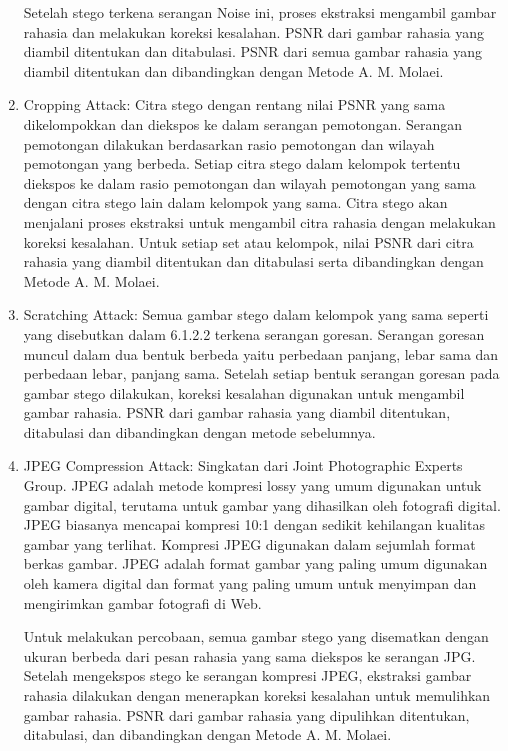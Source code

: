 \documentclass{ittelkom}
\begin{document}
\begin{enumerate}
          Setelah stego terkena serangan Noise ini, proses ekstraksi mengambil gambar
          rahasia dan melakukan koreksi kesalahan. PSNR dari gambar rahasia yang diambil
          ditentukan dan ditabulasi. PSNR dari semua gambar rahasia yang diambil
          ditentukan dan dibandingkan dengan Metode A. M. Molaei.

    \item Cropping Attack: Citra stego dengan rentang nilai PSNR yang sama dikelompokkan
          dan diekspos ke dalam serangan pemotongan. Serangan pemotongan dilakukan
          berdasarkan rasio pemotongan dan wilayah pemotongan yang berbeda. Setiap citra
          stego dalam kelompok tertentu diekspos ke dalam rasio pemotongan dan wilayah
          pemotongan yang sama dengan citra stego lain dalam kelompok yang sama. Citra
          stego akan menjalani proses ekstraksi untuk mengambil citra rahasia dengan
          melakukan koreksi kesalahan. Untuk setiap set atau kelompok, nilai PSNR dari
          citra rahasia yang diambil ditentukan dan ditabulasi serta dibandingkan dengan
          Metode A. M. Molaei.
    \item Scratching Attack: Semua gambar stego dalam kelompok yang sama seperti yang
          disebutkan dalam 6.1.2.2 terkena serangan goresan. Serangan goresan muncul
          dalam dua bentuk berbeda yaitu perbedaan panjang, lebar sama dan perbedaan
          lebar, panjang sama. Setelah setiap bentuk serangan goresan pada gambar stego
          dilakukan, koreksi kesalahan digunakan untuk mengambil gambar rahasia. PSNR
          dari gambar rahasia yang diambil ditentukan, ditabulasi dan dibandingkan dengan
          metode sebelumnya.
    \item JPEG Compression Attack: Singkatan dari Joint Photographic Experts Group. JPEG
          adalah metode kompresi lossy yang umum digunakan untuk gambar digital, terutama
          untuk gambar yang dihasilkan oleh fotografi digital. JPEG biasanya mencapai
          kompresi 10:1 dengan sedikit kehilangan kualitas gambar yang
          terlihat.\cite{ch2015medical} Kompresi JPEG digunakan dalam sejumlah format
          berkas gambar. JPEG adalah format gambar yang paling umum digunakan oleh kamera
          digital dan format yang paling umum untuk menyimpan dan mengirimkan gambar
          fotografi di Web.

          Untuk melakukan percobaan, semua gambar stego yang disematkan dengan ukuran
          berbeda dari pesan rahasia yang sama diekspos ke serangan JPG. Setelah
          mengekspos stego ke serangan kompresi JPEG, ekstraksi gambar rahasia dilakukan
          dengan menerapkan koreksi kesalahan untuk memulihkan gambar rahasia. PSNR dari
          gambar rahasia yang dipulihkan ditentukan, ditabulasi, dan dibandingkan dengan
          Metode A. M. Molaei.
\end{enumerate}
\end{document}
